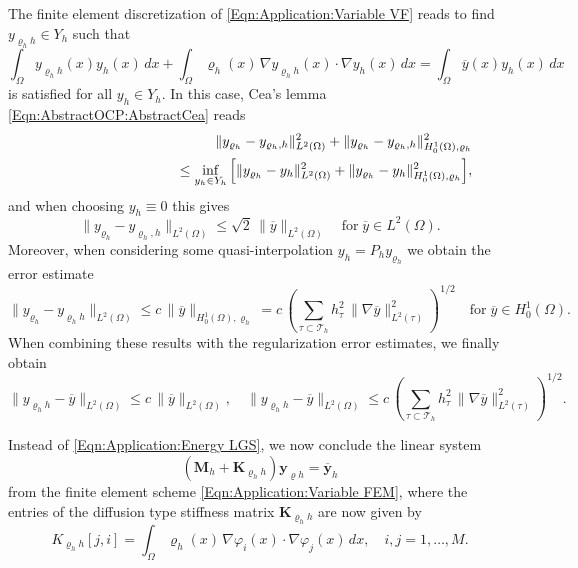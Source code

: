 \documentclass{article}
\numberwithin{equation}{section}
\begin{document}
The finite element discretization of \eqref{Eqn:Application:Variable VF}
reads to find $y_{\varrho_h h} \in Y_h$ such that
\begin{equation}\label{Eqn:Application:Variable FEM}
  \int_\Omega y_{\varrho_h h}(x) y_h(x) \, dx +
  \int_\Omega \varrho_h(x) \, \nabla y_{\varrho_h h}(x) \cdot \nabla y_h(x) \, dx
  =
  \int_\Omega \overline{y}(x) y_h(x) \, dx
\end{equation}
is satisfied for all $y_h \in Y_h$.
In this case, Cea's lemma \eqref{Eqn:AbstractOCP:AbstractCea} reads
\begin{eqnarray*}
  && \| y_{\varrho_h} - y_{\varrho_h,h} \|^2_{L^2(\Omega)} +
     \| y_{\varrho_h} - y_{\varrho_h,h} \|^2_{H^1_0(\Omega),\varrho_h} \\
  && \hspace*{3cm}
     \leq \inf\limits_{y_h \in Y_h}
     \Big[
     \| y_{\varrho_h} - y_h \|^2_{L^2(\Omega)} +
     \| y_{\varrho_h} - y_h \|^2_{H^1_0(\Omega),\varrho_h}
     \Big] ,
\end{eqnarray*}
and when choosing $y_h \equiv 0$ this gives
\[
  \| y_{\varrho_h} - y_{\varrho_h,h} \|_{L^2(\Omega)} \leq
  \sqrt{2} \, \| \overline{y} \|_{L^2(\Omega)} \quad
  \mbox{for} \; \overline{y} \in L^2(\Omega) .
\]
Moreover, when considering some quasi-interpolation $y_h = P_h y_{\varrho_h}$
we obtain the error estimate
\[
  \| y_{\varrho_h} - y_{\varrho_hh} \|_{L^2(\Omega)} \leq
  c \, \| \overline{y} \|_{H^1_0(\Omega),\varrho_h} =
  c \, \left(
    \sum\limits_{\tau \subset {\mathcal{T}}_h}
    h_\tau^2 \, \| \nabla \overline{y} \|^2_{L^2(\tau)}
  \right)^{1/2} \quad \mbox{for} \;
  \overline{y} \in H^1_0(\Omega) .
\]
When combining these results with the regularization error estimates,
we finally obtain
\[
  \| y_{\varrho_hh} - \overline{y} \|_{L^2(\Omega)} \leq
  c \, \| \overline{y} \|_{L^2(\Omega)}, \quad
  \| y_{\varrho_hh} - \overline{y} \|_{L^2(\Omega)} \leq
  c \, \left(
    \sum\limits_{\tau \subset {\mathcal{T}}_h}
    h_\tau^2 \, \| \nabla \overline{y} \|^2_{L^2(\tau)}
  \right)^{1/2} .
\]

%
Instead of \eqref{Eqn:Application:Energy LGS}, we now conclude
the linear system
%
\begin{equation}
  (\mathbf{M}_h + \mathbf{K}_{\varrho_h h}) \mathbf{y}_{\varrho h} = \overline{\mathbf{y}}_h
\end{equation}
%
from the finite element scheme \eqref{Eqn:Application:Variable FEM},
where the entries of the diffusion type stiffness matrix
$\mathbf{K}_{\varrho_h h}$
are now given by
\[
  K_{\varrho_hh}[j,i] = \int_\Omega \varrho_h(x) \,
  \nabla \varphi_i(x) \cdot \nabla \varphi_j(x) \, dx, \quad
  i,j=1,\ldots,M.
\]
%
\end{document}
